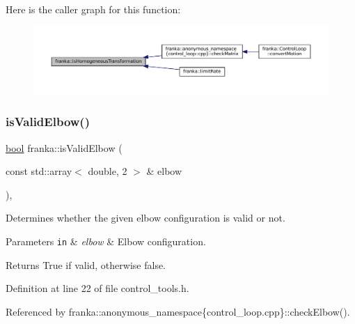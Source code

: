 Here is the caller graph for this function\+:
\nopagebreak
\begin{figure}[H]
\begin{center}
\leavevmode
\includegraphics[width=350pt]{namespacefranka_ad81c99e8af3f2536ae3c6ec1ce8dce1e_icgraph}
\end{center}
\end{figure}
\mbox{\label{namespacefranka_a4eda3eda0514fabf6d630a6d8c0373a0}} 
\subsubsection{\texorpdfstring{is\+Valid\+Elbow()}{isValidElbow()}}
{\footnotesize\ttfamily \hyperlink{classbool}{bool} franka\+::is\+Valid\+Elbow (\begin{DoxyParamCaption}\item[{const std\+::array$<$ double, 2 $>$ \&}]{elbow }\end{DoxyParamCaption})\hspace{0.3cm}{\ttfamily [inline]}, {\ttfamily [noexcept]}}

Determines whether the given elbow configuration is valid or not.


\begin{DoxyParams}[1]{Parameters}
\mbox{\tt in}  & {\em elbow} & Elbow configuration.\\
\hline
\end{DoxyParams}
\begin{DoxyReturn}{Returns}
True if valid, otherwise false. 
\end{DoxyReturn}


Definition at line 22 of file control\+\_\+tools.\+h.



Referenced by franka\+::anonymous\+\_\+namespace\{control\+\_\+loop.\+cpp\}\+::check\+Elbow().


